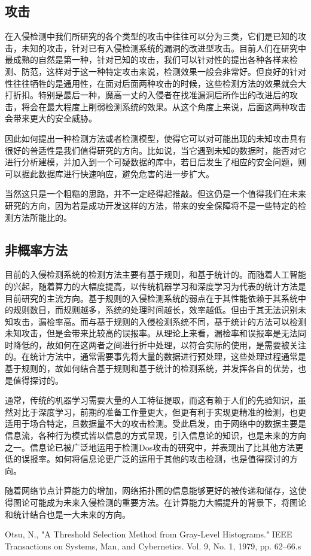 \documentclass[12pt]{article} %
\begin{document}
\subsection{攻击}
\label{attack}

在入侵检测中我们所研究的各个类型的攻击中往往可以分为三类，它们是已知的攻击，未知的攻击，针对已有入侵检测系统的漏洞的改进型攻击。目前人们在研究中最成熟的自然是第一种，针对已知的攻击，我们可以针对性的提出各种各样来检测、防范，这样对于这一种特定攻击来说，检测效果一般会非常好。但良好的针对性往往牺牲的是通用性，在面对后面两种攻击的时候，这些检测方法的效果就会大打折扣。特别是最后一种，魔高一丈的入侵者在找准漏洞后所作出的改进后的攻击，将会在最大程度上削弱检测系统的效果。从这个角度上来说，后面这两种攻击会带来更大的安全威胁。

因此如何提出一种检测方法或者检测模型，使得它可以对可能出现的未知攻击具有很好的普适性是我们值得研究的方向。比如说，当它遇到未知的数据时，能否对它进行分析建模，并加入到一个可疑数据的库中，若日后发生了相应的安全问题，则可以据此数据库进行快速响应，避免危害的进一步扩大。

当然这只是一个粗糙的思路，并不一定经得起推敲。但这仍是一个值得我们在未来研究的方向，因为若是成功开发这样的方法，带来的安全保障将不是一些特定的检测方法所能比的。

\subsection{非概率方法}
\label{nonprob}

目前的入侵检测系统的检测方法主要有基于规则，和基于统计的。而随着人工智能的兴起，随着算力的大幅度提高，以传统机器学习和深度学习为代表的统计方法是目前研究的主流方向。基于规则的入侵检测系统的弱点在于其性能依赖于其系统中的规则数目，而规则越多，系统的处理时间越长，效率越低。但由于其无法识别未知攻击，漏检率高。而与基于规则的入侵检测系统不同，基于统计的方法可以检测未知攻击，但是会带来比较高的误报率。从理论上来看，漏检率和误报率是无法同时降低的，故如何在这两者之间进行折中处理，以符合实际的使用，是需要被关注的。在统计方法中，通常需要事先将大量的数据进行预处理，这些处理过程通常是基于规则的，故如何结合基于规则和基于统计的检测系统，并发挥各自的优势，也是值得探讨的。

通常，传统的机器学习需要大量的人工特征提取，而这有赖于人们的先验知识，虽然对比于深度学习，前期的准备工作量更大，但更有利于实现更精准的检测，也更适用于场合特定，且数据量不大的攻击检测。受此启发，由于网络中的数据主要是信息流，各种行为模式皆以信息的方式呈现，引入信息论的知识，也是未来的方向之一。信息论已被广泛地运用于检测Dos攻击的研究中，并表现出了比其他方法更低的误报率。如何将信息论更广泛的运用于其他的攻击检测，也是值得探讨的方向。

随着网络节点计算能力的增加，网络拓扑图的信息能够更好的被传递和储存，这使得图论可能成为未来入侵检测的重要方法。在计算能力大幅提升的背景下，将图论和统计结合也是一大未来的方向。

\begin{thebibliography}{99}

 Otsu, N., "A Threshold Selection Method from Gray-Level Histograms." IEEE Transactions on Systems, Man, and Cybernetics. Vol. 9, No. 1, 1979, pp. 62–66.s

\end{thebibliography}
\end{document}
